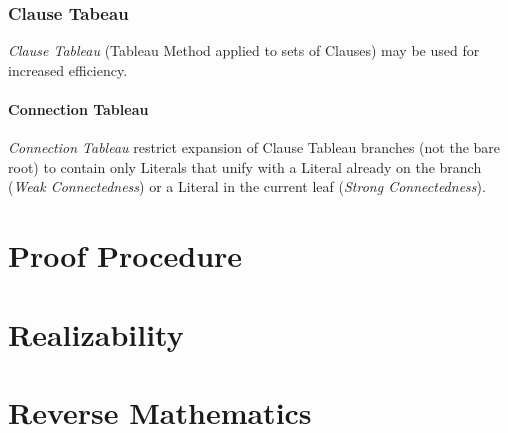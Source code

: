 \subsubsection{Clause Tabeau} \label{sec:clause_tableau}

\emph{Clause Tableau} (Tableau Method applied to sets of Clauses) may
be used for increased efficiency.

\paragraph{Connection Tableau} \label{sec:connection_tableau}

\emph{Connection Tableau} restrict expansion of Clause Tableau
branches (not the bare root) to contain only Literals that unify with
a Literal already on the branch (\emph{Weak Connectedness}) or a
Literal in the current leaf (\emph{Strong Connectedness}).



\section{Proof Procedure}\label{sec:proof_procedure}

\section{Realizability} \label{sec:realizability}

\section{Reverse Mathematics} \label{sec:reverse_mathematics}
